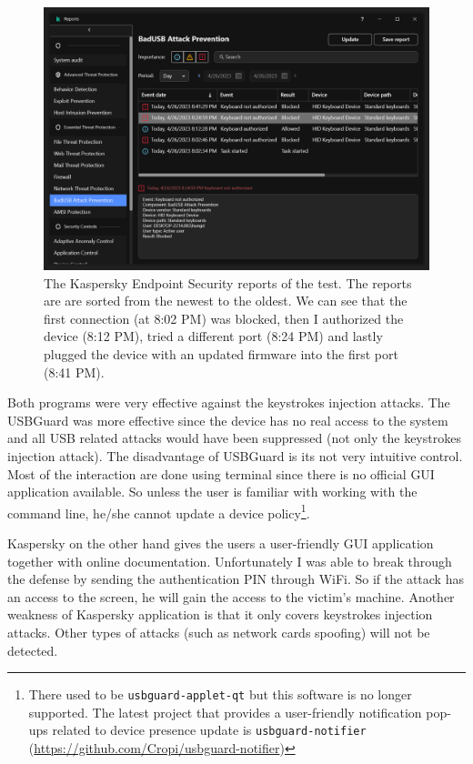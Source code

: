 \begin{figure}[ht]
    \centering
    \includegraphics[width=0.9\linewidth]{./obrazky-figures/kaspersky_report.PNG}
    \caption{The Kaspersky Endpoint Security reports of the test. The reports are are sorted from the newest to the oldest. We can see that the first connection (at 8:02 PM) was blocked, then I authorized the device (8:12 PM), tried a different port (8:24 PM) and lastly plugged the device with an updated firmware into the first port (8:41 PM).}
    \label{fig:kaspersky_report}
\end{figure}

Both programs were very effective against the keystrokes injection attacks. The USBGuard was more effective since the device has no real access to the system and all USB related attacks would have been suppressed (not only the keystrokes injection attack). The disadvantage of USBGuard is its not very intuitive control. Most of the interaction are done using terminal since there is no official GUI application available. So unless the user is familiar with working with the command line, he/she cannot update a device policy\footnote{There used to be \texttt{usbguard-applet-qt} but this software is no longer supported. The latest project that provides a user-friendly notification pop-ups related to device presence update is \texttt{usbguard-notifier} (\url{https://github.com/Cropi/usbguard-notifier})}.

Kaspersky on the other hand gives the users a user-friendly GUI application together with online documentation. Unfortunately I was able to break through the defense by sending the authentication PIN through WiFi. So if the attack has an access to the screen, he will gain the access to the victim's machine. Another weakness of Kaspersky application is that it only covers keystrokes injection attacks. Other types of attacks (such as network cards spoofing) will not be detected.


